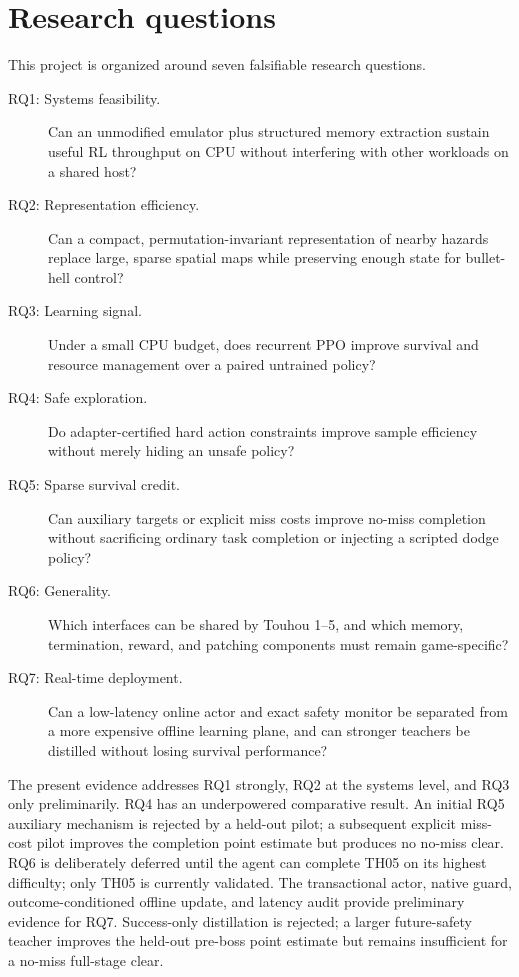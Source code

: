 \documentclass[10pt]{article}
\begin{document}
\section{Research questions}

This project is organized around seven falsifiable research questions.

\begin{description}
  \item[RQ1: Systems feasibility.] Can an unmodified emulator plus structured
  memory extraction sustain useful RL throughput on CPU without interfering
  with other workloads on a shared host?

  \item[RQ2: Representation efficiency.] Can a compact, permutation-invariant
  representation of nearby hazards replace large, sparse spatial maps while
  preserving enough state for bullet-hell control?

  \item[RQ3: Learning signal.] Under a small CPU budget, does recurrent PPO
  improve survival and resource management over a paired untrained policy?

  \item[RQ4: Safe exploration.] Do adapter-certified hard action constraints
  improve sample efficiency without merely hiding an unsafe policy?

  \item[RQ5: Sparse survival credit.] Can auxiliary targets or explicit
  miss costs improve no-miss completion without sacrificing ordinary task
  completion or injecting a scripted dodge policy?

  \item[RQ6: Generality.] Which interfaces can be shared by Touhou 1--5, and
  which memory, termination, reward, and patching components must remain
  game-specific?

  \item[RQ7: Real-time deployment.] Can a low-latency online actor and exact
  safety monitor be separated from a more expensive offline learning plane,
  and can stronger teachers be distilled without losing survival performance?
\end{description}

The present evidence addresses RQ1 strongly, RQ2 at the systems level, and RQ3
only preliminarily.  RQ4 has an underpowered comparative result.  An initial
RQ5 auxiliary mechanism is rejected by a held-out pilot; a subsequent explicit
miss-cost pilot improves the completion point estimate but produces no no-miss
clear.  RQ6 is deliberately deferred until the agent can complete TH05 on its
highest difficulty; only TH05 is currently validated.  The transactional actor,
native guard, outcome-conditioned offline update, and latency audit provide
preliminary evidence for RQ7.  Success-only distillation is rejected; a larger
future-safety teacher improves the held-out pre-boss point estimate but remains
insufficient for a no-miss full-stage clear.
\end{document}

